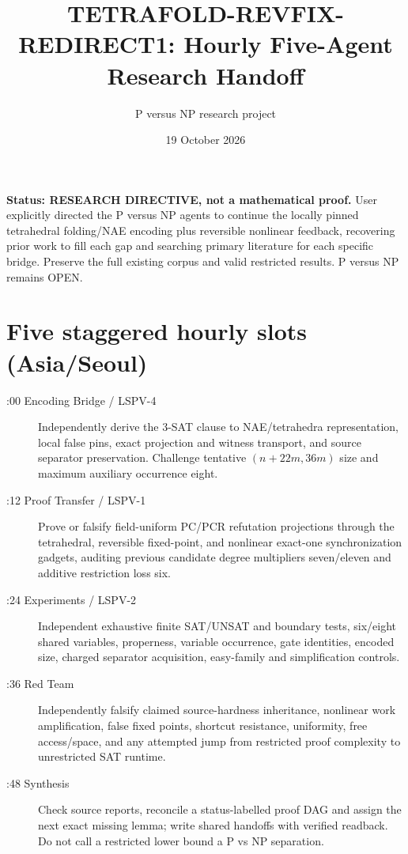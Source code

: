 \documentclass[11pt]{article}
\title{TETRAFOLD-REVFIX-REDIRECT1: Hourly Five-Agent Research Handoff}
\author{P versus NP research project}
\date{19 October 2026}
\begin{document}
\maketitle
\noindent\textbf{Status: RESEARCH DIRECTIVE, not a mathematical proof.}
User explicitly directed the P versus NP agents to continue the locally pinned tetrahedral folding/NAE encoding plus reversible nonlinear feedback, recovering prior work to fill each gap and searching primary literature for each specific bridge. Preserve the full existing corpus and valid restricted results. P versus NP remains OPEN.

\section*{Five staggered hourly slots (Asia/Seoul)}
\begin{description}
\item[:00 Encoding Bridge / LSPV-4] Independently derive the 3-SAT clause to NAE/tetrahedra representation, local false pins, exact projection and witness transport, and source separator preservation. Challenge tentative $(n+22m,36m)$ size and maximum auxiliary occurrence eight.
\item[:12 Proof Transfer / LSPV-1] Prove or falsify field-uniform PC/PCR refutation projections through the tetrahedral, reversible fixed-point, and nonlinear exact-one synchronization gadgets, auditing previous candidate degree multipliers seven/eleven and additive restriction loss six.
\item[:24 Experiments / LSPV-2] Independent exhaustive finite SAT/UNSAT and boundary tests, six/eight shared variables, properness, variable occurrence, gate identities, encoded size, charged separator acquisition, easy-family and simplification controls.
\item[:36 Red Team] Independently falsify claimed source-hardness inheritance, nonlinear work amplification, false fixed points, shortcut resistance, uniformity, free access/space, and any attempted jump from restricted proof complexity to unrestricted SAT runtime.
\item[:48 Synthesis] Check source reports, reconcile a status-labelled proof DAG and assign the next exact missing lemma; write shared handoffs with verified readback. Do not call a restricted lower bound a P vs NP separation.
\end{description}
\end{document}
